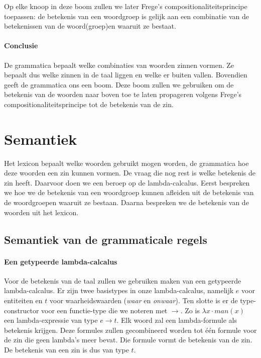 Op elke knoop in deze boom zullen we later Frege's compositionaliteitsprincipe toepassen: de betekenis van een woordgroep is gelijk aan een combinatie van de betekenissen van de woord(groep)en waaruit ze bestaat.

\paragraph{Conclusie} De grammatica bepaalt welke combinaties van woorden zinnen vormen. Ze bepaalt dus welke zinnen in de taal liggen en welke er buiten vallen. Bovendien geeft de grammatica ons een boom. Deze boom zullen we gebruiken om de betekenis van de woorden naar boven toe te laten propageren volgens Frege's compositionaliteitsprincipe tot de betekenis van de zin.

\section{Semantiek}
Het lexicon bepaalt welke woorden gebruikt mogen worden, de grammatica hoe deze woorden een zin kunnen vormen. De vraag die nog rest is welke betekenis de zin heeft. Daarvoor doen we een beroep op de lambda-calcalus. Eerst bespreken we hoe we de betekenis van een woordgroep kunnen afleiden uit de betekenis van de woordgroepen waaruit ze bestaan. Daarna bespreken we de betekenis van de woorden uit het lexicon.

\subsection{Semantiek van de grammaticale regels}
\paragraph{Een getypeerde lambda-calcalus}
Voor de betekenis van de taal zullen we gebruiken maken van een getypeerde lambda-calcalus. Er zijn twee basistypes in onze lambda-calcalus, namelijk $e$ voor entiteiten en $t$ voor waarheidswaarden (\textit{waar} en \textit{onwaar}). Ten slotte is er de type-constructor voor een functie-type die we noteren met $\rightarrow$. Zo is $\lambda x \cdot man(x)$ een lambda-expressie van type $e \rightarrow t$. Elk woord zal een lambda-formule als betekenis krijgen. Deze formules zullen gecombineerd worden tot één formule voor de zin die geen lambda's meer bevat. Die formule vormt de betekenis van de zin. De betekenis van een zin is dus van type $t$.


